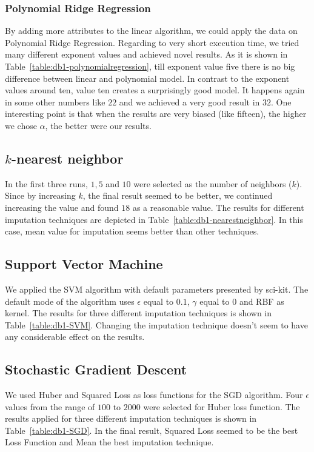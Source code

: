 \subsubsection{Polynomial Ridge Regression}
By adding more attributes to the linear algorithm, we could apply the data on Polynomial Ridge Regression. Regarding to very short execution time, we tried many different exponent values and achieved novel results. As it is shown in Table~\ref{table:db1-polynomialregression}, till exponent value five there is no big difference between linear and polynomial model. In contrast to the exponent values around ten, value ten creates a surprisingly good model. It happens again in some other numbers like $22$ and we achieved a very good result in $32$. One interesting point is that when the results are very biased (like fifteen), the higher we chose $\alpha$, the better were our results.

\subsection{$k$-nearest neighbor}
In the first three runs, $1, 5$ and $10$ were selected as the number of neighbors ($k$). Since by increasing $k$, the final result seemed to be better, we continued increasing the value and found $18$ as a reasonable value. The results for different imputation techniques are depicted in Table~\ref{table:db1-nearestneighbor}. In this case, mean value for imputation seems better than other techniques.

\subsection{Support Vector Machine}
We applied the SVM algorithm with default parameters presented by sci-kit. The default mode of the algorithm uses $\epsilon$ equal to $0.1$, $\gamma$ equal to $0$ and RBF as kernel. The results for three different imputation techniques is shown in Table~\ref{table:db1-SVM}. Changing the imputation technique doesn't seem to have any considerable effect on the results.

\subsection{Stochastic Gradient Descent}
We used Huber and Squared Loss as loss functions for the SGD algorithm. Four $\epsilon$ values from the range of $100$ to $2000$ were selected for Huber loss function. The results applied for three different imputation techniques is shown in Table~\ref{table:db1-SGD}. In the final result, Squared Loss seemed to be the best Loss Function and Mean the best imputation technique.

